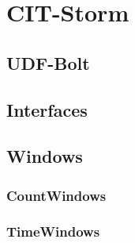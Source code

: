 \section{CIT-Storm}
\label{sect:citStorm}

\subsection{UDF-Bolt}
\label{sect:udfBolt}

\subsection{Interfaces}
\label{sect:interfaces}

\subsection{Windows}
\label{sect:windows}

\subsubsection{CountWindows}

\subsubsection{TimeWindows}